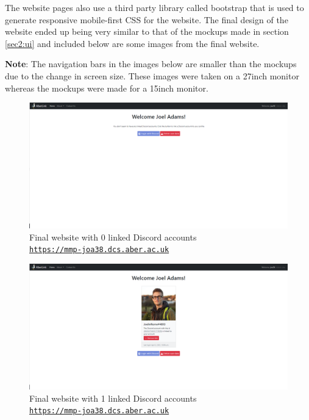 The website pages also use a third party library called bootstrap \cite{bootstrap} that is used to generate responsive mobile-first CSS for the website. The final design of the website ended up being very similar to that of the mockups made in section \ref{sec2:ui} and included below are some images from the final website.

\textbf{Note}: The navigation bars in the images below are smaller than the mockups due to the change in screen size. These images were taken on a 27inch monitor whereas the mockups were made for a 15inch monitor.

\begin{figure}[H]
	\centering
	\includegraphics[width=1\linewidth]{Figures/website-acc-0.png}
	\caption{Final website with 0 linked Discord accounts \\\centering\href{https://mmp-joa38.dcs.aber.ac.uk}{\textsf{\nolinkurl{https://mmp-joa38.dcs.aber.ac.uk}}}}
	\label{fig:final-web-acc-0}
\end{figure}

\begin{figure}[H]
	\centering
	\includegraphics[width=1\linewidth]{Figures/website-acc-1.png}
	\caption{Final website with 1 linked Discord accounts \\\centering\href{https://mmp-joa38.dcs.aber.ac.uk}{\nolinkurl{https://mmp-joa38.dcs.aber.ac.uk}}}
	\label{fig:final-web-acc-1}
\end{figure}

